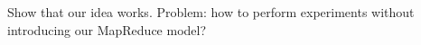 
Show that our idea works. Problem: how to perform experiments without introducing our MapReduce model?
